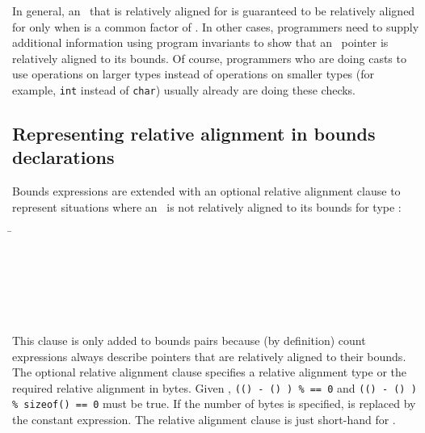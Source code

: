 In general, an
\arrayptrT\ that is
relatively aligned for  is guaranteed to be relatively aligned
for  only
when  is a common factor of
. In other cases, programmers need to
supply additional information using program invariants to show that an
\arrayptr\ pointer is relatively aligned to its bounds. Of
course, programmers who are doing casts to use operations on larger
types instead of operations on smaller types (for example, \texttt{int}
instead of \texttt{char}) usually already are doing these checks.

\subsection{Representing relative alignment in bounds declarations}
\label{section:representing-relative-alignment}

Bounds expressions are extended with an optional relative alignment 
clause to represent situations where an \arrayptrT\ is not relatively 
aligned to its bounds for type :

\begin{tabbing}
\=\\
\> \var{\ldots{}}\\
\> 
          \\
\\
\\
\>  \\
\>  
\end{tabbing}

This clause is only added to bounds pairs because (by definition) count
expressions always describe pointers that are relatively aligned to
their bounds. The optional relative alignment clause specifies a
relative alignment type  or the required relative alignment in
bytes. Given 
,
\texttt{((\arrayptrchar)  - (\arrayptrchar) ) \%
         == 0} and
\texttt{((\arrayptrchar)  - (\arrayptrchar) ) \%
sizeof() == 0} must be true. If the number of bytes is
specified,  is replaced by the
constant expression.  The relative alignment clause 
is just short-hand for .

